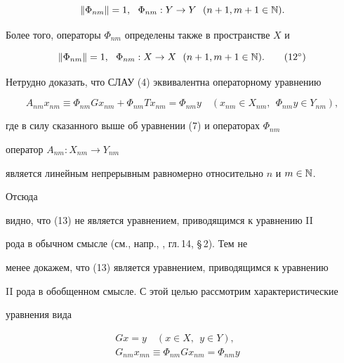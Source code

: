 \begin{pf}
\begin{equation}
\|\Phi_{n m}\|=1,\ \ \Phi_{n m}:Y\to Y 


\ \ (n+1,m+1\in\Bbb N). 


\end{equation} 


Более того, операторы $\Phi_{n m}$ определены также в пространстве $X$ и 


\begin{equation} 


\|\Phi_{n m}\|=1,\ \ \Phi_{n m}:X\to X 


\ \ (n+1,m+1\in\Bbb N). \tag{12$^\circ$} 


\end{equation} 


 


Нетрудно доказать, что СЛАУ (4) эквивалентна операторному уравнению 


\begin{equation} 


A_{n m}x_{n m}\equiv\Phi_{n m}G x_{n m}+\Phi_{n m} 


T x_{n m}=\Phi_{n m}y\quad 


(x_{n m}\in X_{n m},\ \ \Phi_{n m}y\in Y_{n m}), 


\end{equation} 


где в силу сказанного выше об уравнении (7) и операторах $\Phi_{n m}$ 


оператор $A_{n m}:X_{n m}\to Y_{n m}$ 


является линейным непрерывным равномерно относительно $n$ и $m\in\Bbb N$. 


Отсюда 


видно, что (13) не является уравнением, приводящимся к уравнению II 


рода в обычном смысле (см., напр., \cite{6}, гл.\,14, \S\,2). Тем не 


менее докажем, что (13) является уравнением, приводящимся к уравнению 


II рода в обобщенном смысле. С этой целью рассмотрим характеристические 


уравнения вида 


\begin{gather} 


G x=y\quad (x\in X,\ \ y\in Y),\tag{7$^\circ$} \\ 


% 


G_{n m}x_{m n}\equiv\Phi_{n m}G x_{n m}=\Phi_{n m}y\quad 



\end{gather}
\end{pf}
